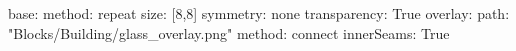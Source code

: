 base:
  method: repeat
  size: [8,8]
  symmetry: none
  transparency: True
overlay:
  path: "Blocks/Building/glass_overlay.png"
  method: connect
  innerSeams: True